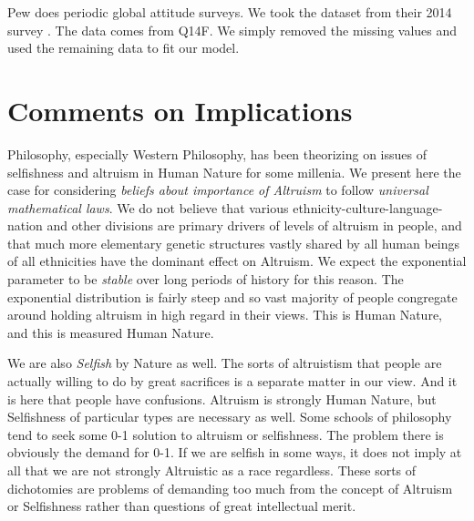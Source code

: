 \documentclass{amsart}
\begin{document}
Pew does periodic global attitude surveys.  We took the dataset from their 2014 survey \cite{Pew14}.  The data comes from Q14F.  We simply removed the missing values and used the remaining data to fit our model.

\section{Comments on Implications}

Philosophy, especially Western Philosophy, has been theorizing on issues of selfishness and altruism in Human Nature for some millenia.  We present here the case for considering {\em beliefs about importance of Altruism} to follow {\em universal mathematical laws}.  We do not believe that various ethnicity-culture-language-nation and other divisions are primary drivers of levels of altruism in people, and that much more elementary genetic structures vastly shared by all human beings of all ethnicities have the dominant effect on Altruism.  We expect the exponential parameter to be {\em stable} over long periods of history for this reason.  The exponential distribution is fairly steep and so vast majority of people congregate around holding altruism in high regard in their views.  This is Human Nature, and this is measured Human Nature.  

We are also {\em Selfish} by Nature as well.  The sorts of altruistism that people are actually willing to do by great sacrifices is a separate matter in our view.  And it is here that people have confusions.  Altruism is strongly Human Nature, but Selfishness of particular types are necessary as well.  Some schools of philosophy tend to seek some 0-1 solution to altruism or selfishness.  The problem there is obviously the demand for 0-1.  If we are selfish in some ways, it does not imply at all that we are not strongly Altruistic as a race regardless.  These sorts of dichotomies are problems of demanding too much from the concept of Altruism or Selfishness rather than questions of great intellectual merit.

\begin{thebibliography}{CCC}
\end{thebibliography}
\end{document}
